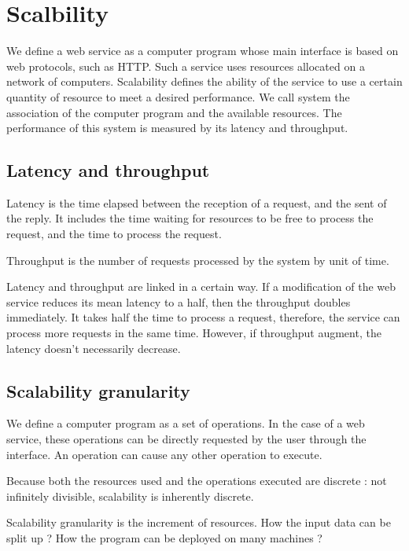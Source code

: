 \chapter{Scalbility}



We define a web service as a computer program whose main interface is based on web protocols, such as HTTP.
Such a service uses resources allocated on a network of computers.
Scalability defines the ability of the service to use a certain quantity of resource to meet a desired performance.
We call system the association of the computer program and the available resources. 
The performance of this system is measured by its latency and throughput.

\section{Latency and throughput}

Latency is the time elapsed between the reception of a request, and the sent of the reply.
It includes the time waiting for resources to be free to process the request, and the time to process the request.

Throughput is the number of requests processed by the system by unit of time.

Latency and throughput are linked in a certain way.
If a modification of the web service reduces its mean latency to a half, then the throughput doubles immediately.
It takes half the time to process a request, therefore, the service can process more requests in the same time.
However, if throughput augment, the latency doesn't necessarily decrease.

\section{Scalability granularity}

We define a computer program as a set of operations.
In the case of a web service, these operations can be directly requested by the user through the interface.
An operation can cause any other operation to execute.

Because both the resources used and the operations executed are discrete : not infinitely divisible, scalability is inherently discrete.


Scalability granularity is the increment of resources.
How the input data can be split up ?
How the program can be deployed on many machines ?






